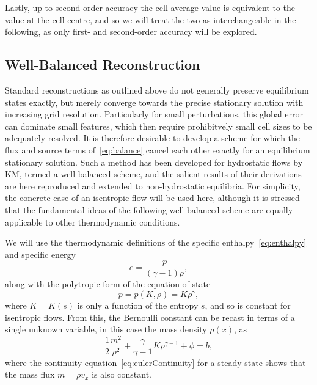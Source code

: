 Lastly, up to second-order accuracy the cell average value is equivalent to the value at the cell centre, and so we will treat the two as interchangeable in the following, as only first- and second-order accuracy will be explored. 

\subsection{Well-Balanced Reconstruction}
\label{subsec:wellBalanced}

Standard reconstructions as outlined above do not generally preserve equilibrium states exactly, but merely converge towards the precise stationary solution with increasing grid resolution. Particularly for small perturbations, this global error can dominate small features, which then require prohibitvely small cell sizes to be adequately resolved. It is therefore desirable to develop a scheme for which the flux and source terms of~\eqref{eq:balance} cancel each other exactly for an equilibrium stationary solution. Such a method has been developed for hydrostatic flows by KM, termed a well-balanced scheme, and the salient results of their derivations are here reproduced and extended to non-hydrostatic equilibria. For simplicity, the concrete case of an isentropic flow will be used here, although it is stressed that the fundamental ideas of the following well-balanced scheme are equally applicable to other thermodynamic conditions.

We will use the thermodynamic definitions of the specific enthalpy~\eqref{eq:enthalpy} and specific energy
\begin{equation}
e=\frac{p}{(\gamma-1)\rho},
\end{equation}
along with the polytropic form of the equation of state
\begin{equation}
p=p(K,\rho)=K\rho^{\gamma},
\end{equation}
where $K=K(s)$ is only a function of the entropy $s$, and so is constant for isentropic flows. From this, the Bernoulli constant can be recast in terms of a single unknown variable, in this case the mass density $\rho(x)$, as
\begin{equation}
\frac{1}{2}\frac{m^2}{\rho^2}+\frac{\gamma}{\gamma-1}K\rho^{\gamma-1}+\phi=b, \label{eq:bernoulli}
\end{equation}
where the continuity equation~\eqref{eq:eulerContinuity} for a steady state shows that the mass flux $m=\rho v_x$ is also constant.

